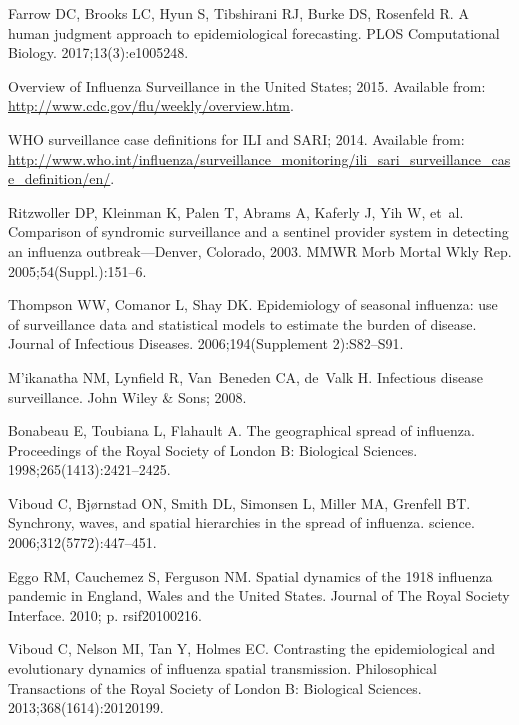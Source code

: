 \documentclass[10pt,letterpaper]{article}
\begin{document}
\begin{thebibliography}{10}
Farrow DC, Brooks LC, Hyun S, Tibshirani RJ, Burke DS, Rosenfeld R.
\newblock A human judgment approach to epidemiological forecasting.
\newblock PLOS Computational Biology. 2017;13(3):e1005248.

Overview of Influenza Surveillance in the United States; 2015.
\newblock Available from: \url{http://www.cdc.gov/flu/weekly/overview.htm}.

WHO surveillance case definitions for ILI and SARI; 2014.
\newblock Available from:
  \url{http://www.who.int/influenza/surveillance_monitoring/ili_sari_surveillance_case_definition/en/}.

Ritzwoller DP, Kleinman K, Palen T, Abrams A, Kaferly J, Yih W, et~al.
\newblock Comparison of syndromic surveillance and a sentinel provider system
  in detecting an influenza outbreak—Denver, Colorado, 2003.
\newblock MMWR Morb Mortal Wkly Rep. 2005;54(Suppl.):151--6.

Thompson WW, Comanor L, Shay DK.
\newblock Epidemiology of seasonal influenza: use of surveillance data and
  statistical models to estimate the burden of disease.
\newblock Journal of Infectious Diseases. 2006;194(Supplement 2):S82--S91.

M'ikanatha NM, Lynfield R, Van~Beneden CA, de~Valk H.
\newblock Infectious disease surveillance.
\newblock John Wiley \& Sons; 2008.

Bonabeau E, Toubiana L, Flahault A.
\newblock The geographical spread of influenza.
\newblock Proceedings of the Royal Society of London B: Biological Sciences.
  1998;265(1413):2421--2425.

Viboud C, Bj{\o}rnstad ON, Smith DL, Simonsen L, Miller MA, Grenfell BT.
\newblock Synchrony, waves, and spatial hierarchies in the spread of influenza.
\newblock science. 2006;312(5772):447--451.

Eggo RM, Cauchemez S, Ferguson NM.
\newblock Spatial dynamics of the 1918 influenza pandemic in England, Wales and
  the United States.
\newblock Journal of The Royal Society Interface. 2010; p. rsif20100216.

Viboud C, Nelson MI, Tan Y, Holmes EC.
\newblock Contrasting the epidemiological and evolutionary dynamics of
  influenza spatial transmission.
\newblock Philosophical Transactions of the Royal Society of London B:
  Biological Sciences. 2013;368(1614):20120199.


\end{thebibliography}
\end{document}

